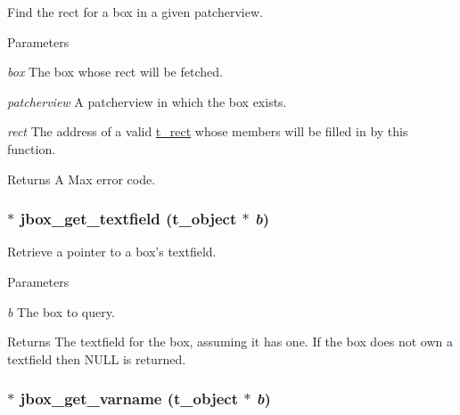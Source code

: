 Find the rect for a box in a given patcherview. 
\begin{DoxyParams}{Parameters}
\item[{\em box}]The box whose rect will be fetched. \item[{\em patcherview}]A patcherview in which the box exists. \item[{\em rect}]The address of a valid \hyperlink{structt__rect}{t\_\-rect} whose members will be filled in by this function. \end{DoxyParams}
\begin{DoxyReturn}{Returns}
A Max error code. 
\end{DoxyReturn}
\hypertarget{group__jbox_ga2f6cb01a3523876b01945baa7800e61e}{
\subsubsection[{jbox\_\-get\_\-textfield}]{$\ast$ jbox\_\-get\_\-textfield ({\bf t\_\-object} $\ast$ {\em b})}}
\label{group__jbox_ga2f6cb01a3523876b01945baa7800e61e}


Retrieve a pointer to a box's textfield. 
\begin{DoxyParams}{Parameters}
\item[{\em b}]The box to query. \end{DoxyParams}
\begin{DoxyReturn}{Returns}
The textfield for the box, assuming it has one. If the box does not own a textfield then NULL is returned. 
\end{DoxyReturn}
\hypertarget{group__jbox_ga0ada31d7aaa4c8e04f0807a3d857a1ad}{
\subsubsection[{jbox\_\-get\_\-varname}]{$\ast$ jbox\_\-get\_\-varname ({\bf t\_\-object} $\ast$ {\em b})}}
\label{group__jbox_ga0ada31d7aaa4c8e04f0807a3d857a1ad}


